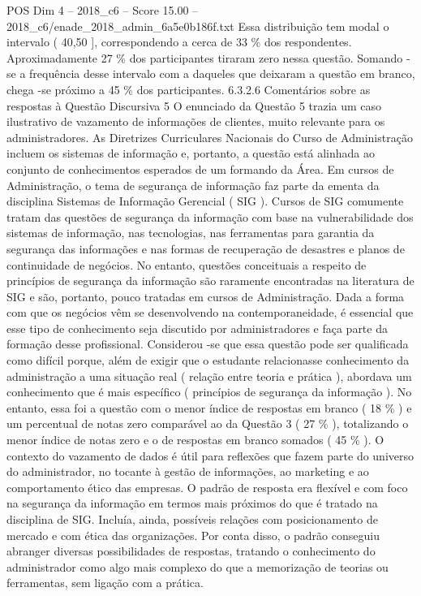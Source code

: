 \begin{textsample}{POS Dim 4 – 2018\_c6 – Score 15.00 – 2018\_c6/enade\_2018\_admin\_6a5e0b186f.txt}
Essa distribuição tem modal o intervalo ( 40,50 ], correspondendo a cerca de 33 \% dos respondentes.
Aproximadamente 27 \% dos participantes tiraram zero nessa questão.
Somando -se a frequência desse intervalo com a daqueles que deixaram a questão em branco, chega -se próximo a 45 \% dos participantes. 6.3.2.6 Comentários sobre as respostas à Questão Discursiva 5 O enunciado da Questão 5 trazia um caso ilustrativo de vazamento de informações de clientes, muito relevante para os administradores.
As Diretrizes Curriculares Nacionais do Curso de Administração incluem os sistemas de informação e, portanto, a questão está alinhada ao conjunto de conhecimentos esperados de um formando da Área.
Em cursos de Administração, o tema de segurança de informação faz parte da ementa da disciplina Sistemas de Informação Gerencial ( SIG ).
Cursos de SIG comumente tratam das questões de segurança da informação com base na vulnerabilidade dos sistemas de informação, nas tecnologias, nas ferramentas para garantia da segurança das informações e nas formas de recuperação de desastres e planos de continuidade de negócios.
No entanto, questões conceituais a respeito de princípios de segurança da informação são raramente encontradas na literatura de SIG e são, portanto, pouco tratadas em cursos de Administração.
Dada a forma com que os negócios vêm se desenvolvendo na contemporaneidade, é essencial que esse tipo de conhecimento seja discutido por administradores e faça parte da formação desse profissional.
Considerou -se que essa questão pode ser qualificada como difícil porque, além de exigir que o estudante relacionasse conhecimento da administração a uma situação real ( relação entre teoria e prática ), abordava um conhecimento que é mais específico ( princípios de segurança da informação ).
No entanto, essa foi a questão com o menor índice de respostas em branco ( 18 \% ) e um percentual de notas zero comparável ao da Questão 3 ( 27 \% ), totalizando o menor índice de notas zero e o de respostas em branco somados ( 45 \% ).
O contexto do vazamento de dados é útil para reflexões que fazem parte do universo do administrador, no tocante à gestão de informações, ao marketing e ao comportamento ético das empresas.
O padrão de resposta era flexível e com foco na segurança da informação em termos mais próximos do que é tratado na disciplina de SIG.
Incluía, ainda, possíveis relações com posicionamento de mercado e com ética das organizações.
Por conta disso, o padrão conseguiu abranger diversas possibilidades de respostas, tratando o conhecimento do administrador como algo mais complexo do que a memorização de teorias ou ferramentas, sem ligação com a prática.

\end{textsample}
